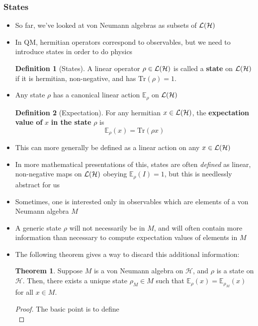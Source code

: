 \documentclass[12pt,a4paper]{article}
\numberwithin{equation}{section}
\theoremstyle{definition}
\newtheorem{definition}{Definition}[section]
\theoremstyle{theorem}
\newtheorem{theorem}{Theorem}[section]
\begin{document}
	\subsubsection{States}
	\begin{itemize}
		\item So far, we've looked at von Neumann algebras as subsets of $\mathcal{L}(\mathcal{H})$
		\item In QM, hermitian operators correspond to observables, but we need to introduce states in order to do physics
		\begin{definition}[States]
			A linear operator $\rho\in\mathcal{L}(\mathcal{H})$ is called a \textbf{state} on $\mathcal{L}(\mathcal{H})$ if it is hermitian, non-negative, and has $\text{Tr}(\rho)=1$.
		\end{definition}
		\item Any state $\rho$ has a canonical linear action $\mathbb{E}_{\rho}$ on $\mathcal{L}(\mathcal{H})$
		\begin{definition}[Expectation]
			For any hermitian $x\in\mathcal{L}(\mathcal{H})$, the \textbf{expectation value of} $x$ \textbf{in the state} $\rho$ is
			\begin{equation}
				\mathbb{E}_{\rho}(x)=\text{Tr}(\rho x)
			\end{equation}
		\end{definition}
		\item This can more generally be defined as a linear action on any $x\in\mathcal{L}(\mathcal{H})$
		\item In more mathematical presentations of this, states are often \textit{defined} as linear, non-negative maps on $\mathcal{L}(\mathcal{H})$ obeying $\mathbb{E}_{\rho}(I)=1$, but this is needlessly abstract for us
		\item Sometimes, one is interested only in observables which are elements of a von Neumann algebra $M$
		\item A generic state $\rho$ will not necessarily be in $M$, and will often contain more information than necessary to compute expectation values of elements in $M$
		\item The following theorem gives a way to discard this additional information:
		\begin{theorem}
			Suppose $M$ is a von Neumann algebra on $\mathcal{H}$, and $\rho$ is a state on $\mathcal{H}$. Then, there exists a unique state $\rho_{M}\in M$ such that $\mathbb{E}_{\rho}(x)=\mathbb{E}_{\rho_M}(x)$ for all $x\in M$.
		\end{theorem}
		\begin{proof}
			The basic point is to define
			\begin{equation}

\end{equation}
\end{proof}
\end{itemize}
\end{document}
